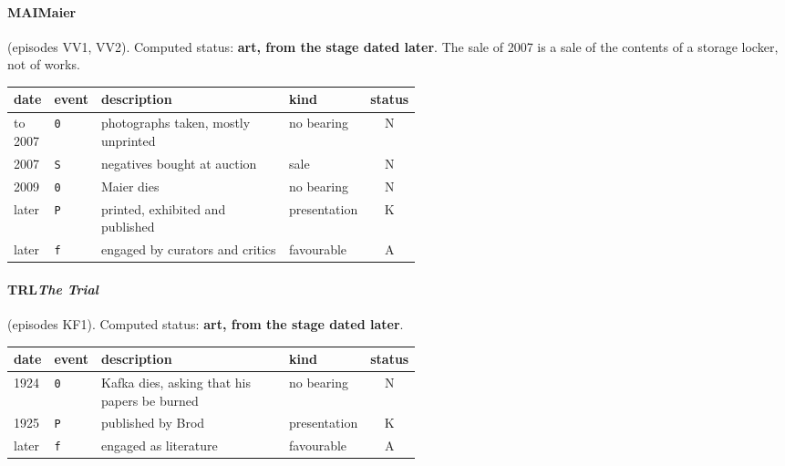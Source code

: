 \paragraph{MAI\enspace Maier} (episodes VV1, VV2). Computed status: \textbf{art, from the stage dated later}. The sale of 2007 is a sale of the contents of a storage locker, not of works.
\begin{center}\footnotesize\begin{tabular}{@{}llp{0.52\linewidth}lc@{}}
date & event & description & kind & status \\ \midrule
to 2007 & \texttt{0} & photographs taken, mostly unprinted & no bearing & N \\
2007 & \texttt{S} & negatives bought at auction & sale & N \\
2009 & \texttt{0} & Maier dies & no bearing & N \\
later & \texttt{P} & printed, exhibited and published & presentation & K \\
later & \texttt{f} & engaged by curators and critics & favourable & A \\
\end{tabular}\end{center}

\paragraph{TRL\enspace \emph{The Trial}} (episodes KF1). Computed status: \textbf{art, from the stage dated later}.
\begin{center}\footnotesize\begin{tabular}{@{}llp{0.52\linewidth}lc@{}}
date & event & description & kind & status \\ \midrule
1924 & \texttt{0} & Kafka dies, asking that his papers be burned & no bearing & N \\
1925 & \texttt{P} & published by Brod & presentation & K \\
later & \texttt{f} & engaged as literature & favourable & A \\
\end{tabular}\end{center}


